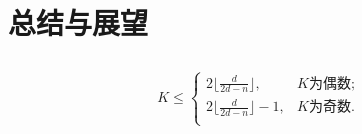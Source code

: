 
\chapter{总结与展望}



\section{}

\begin{equation}
  K \leq 
  \left\{ 
    \begin{array}{cl}
      2 \lfloor \frac{d}{2d - n} \rfloor    , & K \text{为偶数} ; \\
      2 \lfloor \frac{d}{2d - n} \rfloor - 1, & K \text{为奇数}. \\
    \end{array}
  \right. 
\end{equation}